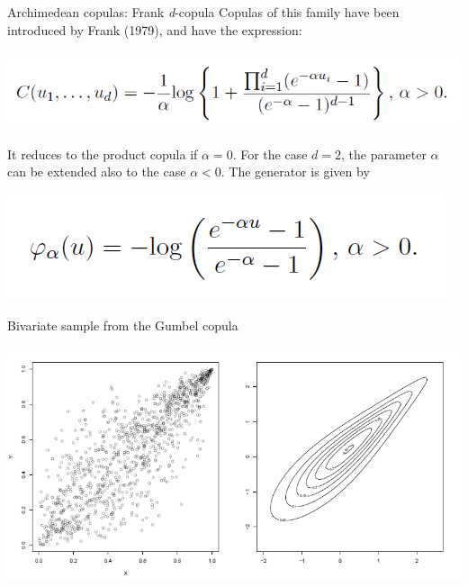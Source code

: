 \documentclass[11pt]{beamer}
\theoremstyle{plain}
\theoremstyle{definition}
\theoremstyle{remark}
\begin{document}
\begin{frame}{Archimedean copulas: Frank \textit{d}-copula}
		Copulas of this family have been introduced by Frank (1979), and have the expression:
		\begin{center}
		\includegraphics[scale=.5]{fig/copule_archimedee_frank_1.PNG} 
		\end{center}
		It reduces to the product copula if $\alpha = 0$. For the case $d = 2$, the parameter $\alpha$ can be extended also to 
		the case $\alpha < 0$. The generator is given by
		\begin{center}
		\includegraphics[scale=.5]{fig/copule_archimedee_frank_2.PNG} 
		\end{center}
\end{frame}
%
\begin{frame}{Bivariate sample from the Gumbel copula}
	\begin{center}
	\includegraphics[scale=.5]{fig/copule_archimedee_gumbel_plot.PNG} 	
	\end{center}
\end{frame}
%
\end{document}
